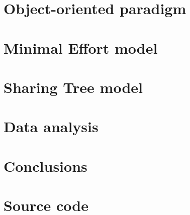 \documentclass[12pt, a4paper,titlepage,openright,twoside]{report}
\begin{document}
\chapter{Object-oriented paradigm}

\newpage
\clearpage{\pagestyle{empty}\cleardoublepage}
\newpage
\chapter{Minimal Effort model}
	\label{Ceffort}

\newpage
\clearpage{\pagestyle{empty}\cleardoublepage}
\newpage
\chapter{Sharing Tree model}
	\label{CTree}

\newpage
\clearpage{\pagestyle{empty}\cleardoublepage}
\newpage
\chapter{Data analysis}
	\label{Cdata}

\newpage
\clearpage{\pagestyle{empty}\cleardoublepage}
\newpage
\chapter{Conclusions}

\newpage
\clearpage{\pagestyle{empty}\cleardoublepage}
\newpage
\appendix
\chapter{Source code} 




\end{document}

